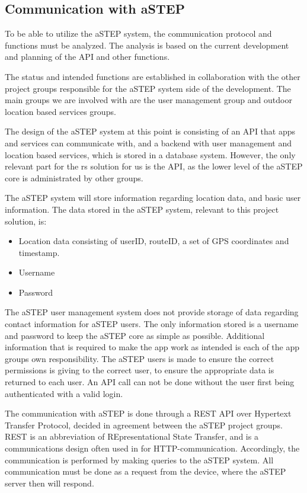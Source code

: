 \subsection{Communication with aSTEP}
To be able to utilize the aSTEP system, the communication protocol and functions must be analyzed. 
The analysis is based on the current development and planning of the API and other functions.

The status and intended functions are established in collaboration with the other project groups responsible for the aSTEP system side of the development. 
The main groups we are involved with are the user management group and outdoor location based services groups.

The design of the aSTEP system at this point is consisting of an API that apps and services can communicate with, and a backend with user management and location based services, which is stored in a database system.
However, the only relevant part for the \gls{rs} solution for us is the API, as the lower level of the aSTEP core is administrated by other groups.

The aSTEP system will store information regarding location data, and basic user information. 
The data stored in the aSTEP system, relevant to this project solution, is:
\begin{itemize}
	\item Location data consisting of userID, routeID, a set of GPS coordinates and timestamp.
	\item Username
	\item Password
\end{itemize}

The aSTEP user management system does not provide storage of data regarding contact information for aSTEP users.
The only information stored is a username and password to keep the aSTEP core as simple as possible.
Additional information that is required to make the app work as intended is each of the app groups own responsibility.
The aSTEP users is made to ensure the correct permissions is giving to the correct user, to ensure the appropriate data is returned to each user.
An API call can not be done without the user first being authenticated with a valid login.

The communication with aSTEP is done through a REST API over Hypertext Transfer Protocol, decided in agreement between the aSTEP project groups.
REST is an abbreviation of REpresentational State Transfer, and is a communications design often used in for HTTP-communication\cite{REST}.
Accordingly, the communication is performed by making queries to the aSTEP system. 
All communication must be done as a request from the device, where the aSTEP server then will respond.



